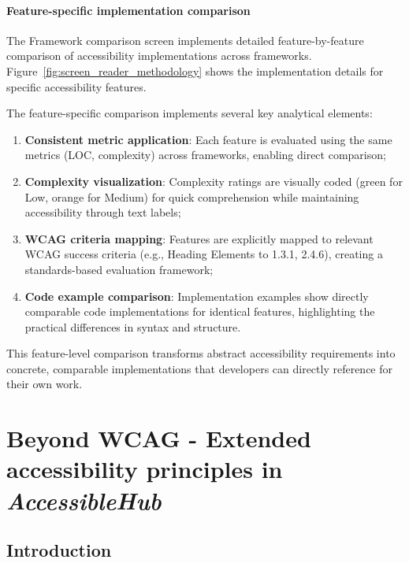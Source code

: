 \subsubsection{Feature-specific implementation comparison}

The Framework comparison screen implements detailed feature-by-feature comparison of accessibility implementations across frameworks. Figure~\ref{fig:screen_reader_methodology} shows the implementation details for specific accessibility features.

The feature-specific comparison implements several key analytical elements:

\begin{enumerate}
    \item \textbf{Consistent metric application}: Each feature is evaluated using the same metrics (LOC, complexity) across frameworks, enabling direct comparison;
    
    \item \textbf{Complexity visualization}: Complexity ratings are visually coded (green for Low, orange for Medium) for quick comprehension while maintaining accessibility through text labels;
    
    \item \textbf{WCAG criteria mapping}: Features are explicitly mapped to relevant WCAG success criteria (e.g., Heading Elements to 1.3.1, 2.4.6), creating a standards-based evaluation framework;
    
    \item \textbf{Code example comparison}: Implementation examples show directly comparable code implementations for identical features, highlighting the practical differences in syntax and structure.
\end{enumerate}

This feature-level comparison transforms abstract accessibility requirements into concrete, comparable implementations that developers can directly reference for their own work.

\chapter{Beyond WCAG - Extended accessibility principles in \textit{AccessibleHub}}
\label{chap:beyond-wcag}

\section{Introduction}
\label{sec:beyond-wcag-intro}

